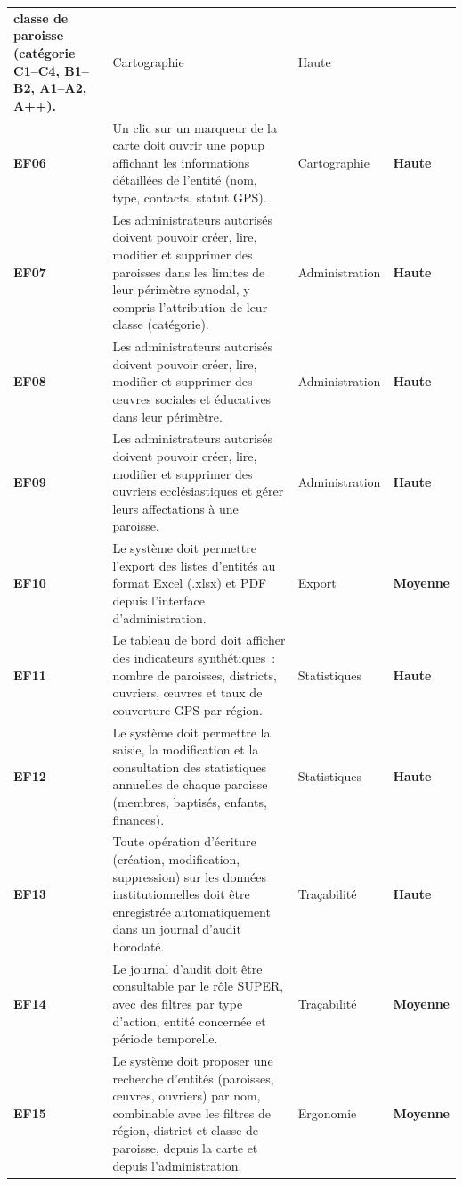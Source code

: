 \documentclass[12pt, a4paper]{report}
\begin{document}
\begin{longtable}{%
  >{\bfseries\color{eccdarkgreen}}m{1.2cm}
  m{7.8cm}
  m{3.5cm}
  >{\centering\arraybackslash\bfseries}m{1.7cm}}
  classe de paroisse (catégorie C1--C4, B1--B2, A1--A2, A++). &
  Cartographie & Haute \\
EF06 & Un clic sur un marqueur de la carte doit ouvrir une popup affichant
  les informations détaillées de l'entité (nom, type, contacts, statut GPS). &
  Cartographie & Haute \\
\rowcolor{eeclightgreen!60}
EF07 & Les administrateurs autorisés doivent pouvoir créer, lire, modifier et
  supprimer des paroisses dans les limites de leur périmètre synodal, y
  compris l'attribution de leur classe (catégorie). &
  Administration & Haute \\
EF08 & Les administrateurs autorisés doivent pouvoir créer, lire, modifier et
  supprimer des œuvres sociales et éducatives dans leur périmètre. &
  Administration & Haute \\
\rowcolor{eeclightgreen!60}
EF09 & Les administrateurs autorisés doivent pouvoir créer, lire, modifier et
  supprimer des ouvriers ecclésiastiques et gérer leurs affectations à une
  paroisse. & Administration & Haute \\
EF10 & Le système doit permettre l'export des listes d'entités au format
  Excel (.xlsx) et PDF depuis l'interface d'administration. & Export & Moyenne \\
\rowcolor{eeclightgreen!60}
EF11 & Le tableau de bord doit afficher des indicateurs synthétiques~:
  nombre de paroisses, districts, ouvriers, œuvres et taux de couverture
  GPS par région. & Statistiques & Haute \\
EF12 & Le système doit permettre la saisie, la modification et la
  consultation des statistiques annuelles de chaque paroisse (membres,
  baptisés, enfants, finances). & Statistiques & Haute \\
\rowcolor{eeclightgreen!60}
EF13 & Toute opération d'écriture (création, modification, suppression) sur
  les données institutionnelles doit être enregistrée automatiquement dans
  un journal d'audit horodaté. & Traçabilité & Haute \\
EF14 & Le journal d'audit doit être consultable par le rôle SUPER, avec des
  filtres par type d'action, entité concernée et période temporelle. &
  Traçabilité & Moyenne \\
\rowcolor{eeclightgreen!60}
EF15 & Le système doit proposer une recherche d'entités (paroisses, œuvres,
  ouvriers) par nom, combinable avec les filtres de région, district et
  classe de paroisse, depuis la carte et depuis l'administration. &
  Ergonomie & Moyenne \\

\end{longtable}
\end{document}

